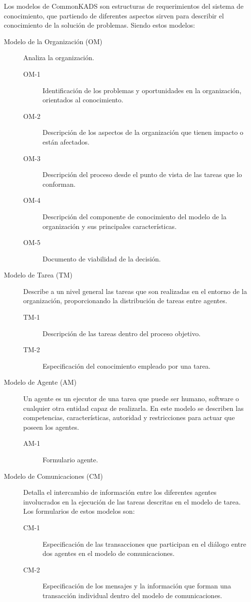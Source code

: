Los modelos de CommonKADS son estructuras de requerimientos del sistema de conocimiento, que partiendo de diferentes aspectos sirven para describir el conocimiento de la solución de problemas. Siendo estos modelos:

\begin{description}

\item[Modelo de la Organización (OM)] Analiza la organización.
  \begin{description}
  \item[OM-1] Identificación de los problemas y oportunidades en la organización, orientados al conocimiento.
  \item[OM-2] Descripción de los aspectos de la organización que tienen impacto o están afectados.
  \item[OM-3] Descripción del proceso desde el punto de vista de las tareas que lo conforman.
  \item[OM-4] Descripción del componente de conocimiento del modelo de la organización y sus principales características.
  \item[OM-5] Documento de viabilidad de la decisión.
  \end{description}

\item[Modelo de Tarea (TM)] Describe a un nivel general las tareas que son realizadas en el entorno de la organización, proporcionando la distribución de tareas entre agentes.
  \begin{description}
  \item[TM-1] Descripción de las tareas dentro del proceso objetivo.
  \item[TM-2] Especificación del conocimiento empleado por una tarea.
  \end{description}

\item[Modelo de Agente (AM)] Un agente es un ejecutor de una tarea que puede ser humano, software o cualquier otra entidad capaz de realizarla. En este modelo se describen las competencias, características, autoridad y restricciones para actuar que poseen los agentes.
  \begin{description}
  \item[AM-1] Formulario agente.
  \end{description}
\item[Modelo de Comunicaciones (CM)] Detalla el intercambio de información entre los diferentes agentes involucrados en la ejecución de las tareas descritas en el modelo de tarea. Los formularios de estos modelos son:
  \begin{description}
  \item[CM-1] Especificación de las transacciones que participan en el diálogo entre dos agentes en el modelo de comunicaciones.
  \item[CM-2] Especificación de los mensajes y la información que forman una transacción individual dentro del modelo de comunicaciones.
  \end{description}


\end{description}
